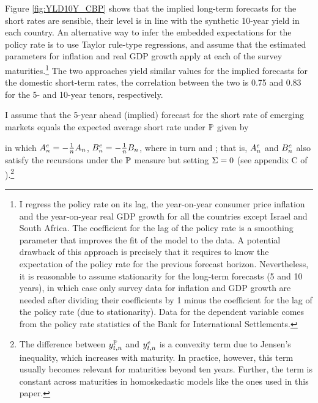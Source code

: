 {Figure \ref{fig:YLD10Y_CBP} shows that the implied long-term forecasts for the short rates are sensible, their level is in line with the synthetic 10-year yield in each country.
An alternative way to infer the embedded expectations for the policy rate is to use Taylor rule-type regressions, and assume that the estimated parameters for inflation and real GDP growth apply at each of the survey maturities.\footnote{ I regress the policy rate on its lag, the year-on-year consumer price inflation and the year-on-year real GDP growth for all the countries except Israel and South Africa. The coefficient for the lag of the policy rate is a smoothing parameter that improves the fit of the model to the data. A potential drawback of this approach is precisely that it requires to know the expectation of the policy rate for the previous forecast horizon. Nevertheless, it is reasonable to assume stationarity for the long-term forecasts (5 and 10 years), in which case only survey data for inflation and GDP growth are needed after dividing their coefficients by 1 minus the coefficient for the lag of the policy rate (due to stationarity). Data for the dependent variable comes from the policy rate statistics of the Bank for International Settlements.}
The two approaches yield similar values for the implied forecasts for the domestic short-term rates, the correlation  between the two is 0.75 and 0.83 for the 5- and 10-year tenors, respectively.

I assume that the 5-year ahead (implied) forecast for the short rate of emerging markets equals the expected average short rate under \(\mathbb{P}\) given by

\noindent in which \(A_{n}^{e} = - \frac{1}{n} A_{n}\), \(B_{n}^{e} = - \frac{1}{n} B_{n}\), where in turn  and ; that is, \(A_{n}^{e}\) and \(B_{n}^{e}\) also satisfy the recursions under the \(\mathbb{P}\) measure but setting \(\Sigma = 0\) (see appendix C of \cite{Guimaraes:2014}).\footnote{ The difference between \(y_{t,n}^{\mathbb{P}}\) and \(y_{t,n}^{e}\) is a convexity term due to Jensen's inequality, which increases with maturity. In practice, however, this term usually becomes relevant for maturities beyond ten years. Further, the term is constant across maturities in homoskedastic models like the ones used in this paper.}

}
